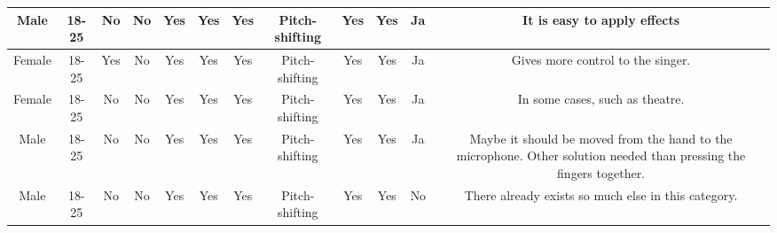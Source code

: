 \begin{table}[]
\begin{tabular}{|c|c|c|c|c|c|c|c|c|c|c|c|}
Male    & 18-25 & No           & No                                                  & Yes                                 & Yes                                            & Yes                       & Pitch-shifting               & Yes                                                   & Yes                                     & Ja                                           & It is easy to apply effects                                                                                         \\ \hline
Female  & 18-25 & Yes          & No                                                  & Yes                                 & Yes                                            & Yes                       & Pitch-shifting               & Yes                                                   & Yes                                     & Ja                                           & Gives more control to the singer.                                                                                   \\ \hline
Female  & 18-25 & No           & No                                                  & Yes                                 & Yes                                            & Yes                       & Pitch-shifting               & Yes                                                   & Yes                                     & Ja                                           & In some cases, such as theatre.                                                                                     \\ \hline
Male    & 18-25 & No           & No                                                  & Yes                                 & Yes                                            & Yes                       & Pitch-shifting               & Yes                                                   & Yes                                     & Ja                                           & Maybe it should be moved from the hand to the microphone. Other solution needed than pressing the fingers together. \\ \hline
Male    & 18-25 & No           & No                                                  & Yes                                 & Yes                                            & Yes                       & Pitch-shifting               & Yes                                                   & Yes                                     & No                                           & There already exists so much else in this category.                                                                 \\ \hline

\end{tabular}
\end{table}
